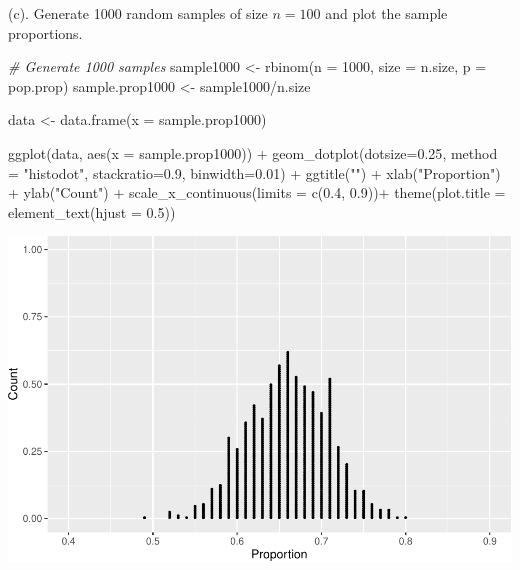 \documentclass[
]{book}
\newenvironment{Shaded}{\begin{snugshade}}{\end{snugshade}}
\newcommand{\AttributeTok}[1]{\textcolor[rgb]{0.77,0.63,0.00}{#1}}
\newcommand{\CommentTok}[1]{\textcolor[rgb]{0.56,0.35,0.01}{\textit{#1}}}
\newcommand{\DecValTok}[1]{\textcolor[rgb]{0.00,0.00,0.81}{#1}}
\newcommand{\FloatTok}[1]{\textcolor[rgb]{0.00,0.00,0.81}{#1}}
\newcommand{\FunctionTok}[1]{\textcolor[rgb]{0.00,0.00,0.00}{#1}}
\newcommand{\NormalTok}[1]{#1}
\newcommand{\OtherTok}[1]{\textcolor[rgb]{0.56,0.35,0.01}{#1}}
\newcommand{\SpecialCharTok}[1]{\textcolor[rgb]{0.00,0.00,0.00}{#1}}
\newcommand{\StringTok}[1]{\textcolor[rgb]{0.31,0.60,0.02}{#1}}
\begin{document}
(c). Generate 1000 random samples of size \(n= 100\) and plot the sample proportions.

\begin{Shaded}
\begin{Highlighting}[]
\CommentTok{\# Generate 1000 samples}
\NormalTok{sample1000 }\OtherTok{\textless{}{-}} \FunctionTok{rbinom}\NormalTok{(}\AttributeTok{n =} \DecValTok{1000}\NormalTok{, }\AttributeTok{size =}\NormalTok{ n.size, }\AttributeTok{p =}\NormalTok{ pop.prop)  }
\NormalTok{sample.prop1000 }\OtherTok{\textless{}{-}}\NormalTok{ sample1000}\SpecialCharTok{/}\NormalTok{n.size }

\NormalTok{data }\OtherTok{\textless{}{-}} \FunctionTok{data.frame}\NormalTok{(}\AttributeTok{x =}\NormalTok{ sample.prop1000)}

\FunctionTok{ggplot}\NormalTok{(data, }\FunctionTok{aes}\NormalTok{(}\AttributeTok{x =}\NormalTok{ sample.prop1000)) }\SpecialCharTok{+}
  \FunctionTok{geom\_dotplot}\NormalTok{(}\AttributeTok{dotsize=}\FloatTok{0.25}\NormalTok{, }\AttributeTok{method =} \StringTok{"histodot"}\NormalTok{, }\AttributeTok{stackratio=}\FloatTok{0.9}\NormalTok{, }\AttributeTok{binwidth=}\FloatTok{0.01}\NormalTok{) }\SpecialCharTok{+}
  \FunctionTok{ggtitle}\NormalTok{(}\StringTok{""}\NormalTok{) }\SpecialCharTok{+}  \FunctionTok{xlab}\NormalTok{(}\StringTok{"Proportion"}\NormalTok{) }\SpecialCharTok{+} \FunctionTok{ylab}\NormalTok{(}\StringTok{"Count"}\NormalTok{) }\SpecialCharTok{+}
  \FunctionTok{scale\_x\_continuous}\NormalTok{(}\AttributeTok{limits =} \FunctionTok{c}\NormalTok{(}\FloatTok{0.4}\NormalTok{, }\FloatTok{0.9}\NormalTok{))}\SpecialCharTok{+} 
  \FunctionTok{theme}\NormalTok{(}\AttributeTok{plot.title =} \FunctionTok{element\_text}\NormalTok{(}\AttributeTok{hjust =} \FloatTok{0.5}\NormalTok{))}
\end{Highlighting}
\end{Shaded}

\includegraphics[width=1\linewidth]{Class_Activity_7_files/figure-latex/unnamed-chunk-7-1}
\end{document}
